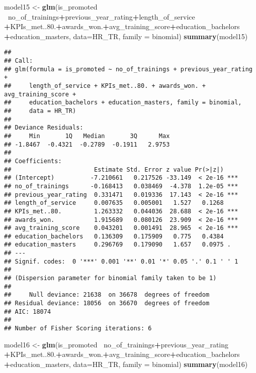 \documentclass[
]{article}
\newenvironment{Shaded}{\begin{snugshade}}{\end{snugshade}}
\newcommand{\DataTypeTok}[1]{\textcolor[rgb]{0.13,0.29,0.53}{#1}}
\newcommand{\FloatTok}[1]{\textcolor[rgb]{0.00,0.00,0.81}{#1}}
\newcommand{\KeywordTok}[1]{\textcolor[rgb]{0.13,0.29,0.53}{\textbf{#1}}}
\newcommand{\NormalTok}[1]{#1}
\newcommand{\OperatorTok}[1]{\textcolor[rgb]{0.81,0.36,0.00}{\textbf{#1}}}
\newcommand{\StringTok}[1]{\textcolor[rgb]{0.31,0.60,0.02}{#1}}
\begin{document}
\begin{Shaded}
\begin{Highlighting}[]
\NormalTok{model15 <-}\StringTok{ }\KeywordTok{glm}\NormalTok{(is_promoted }\OperatorTok{~}\NormalTok{no_of_trainings}\OperatorTok{+}\NormalTok{previous_year_rating}\OperatorTok{+}\NormalTok{length_of_service}
               \OperatorTok{+}\NormalTok{KPIs_met..}\FloatTok{80.}\OperatorTok{+}\NormalTok{awards_won.}\OperatorTok{+}\NormalTok{avg_training_score}\OperatorTok{+}\NormalTok{education_bachelors}
               \OperatorTok{+}\NormalTok{education_masters, }
               \DataTypeTok{data=}\NormalTok{HR_TR, }\DataTypeTok{family =}\NormalTok{ binomial)}
\KeywordTok{summary}\NormalTok{(model15)}
\end{Highlighting}
\end{Shaded}

\begin{verbatim}
## 
## Call:
## glm(formula = is_promoted ~ no_of_trainings + previous_year_rating + 
##     length_of_service + KPIs_met..80. + awards_won. + avg_training_score + 
##     education_bachelors + education_masters, family = binomial, 
##     data = HR_TR)
## 
## Deviance Residuals: 
##     Min       1Q   Median       3Q      Max  
## -1.8467  -0.4321  -0.2789  -0.1911   2.9753  
## 
## Coefficients:
##                       Estimate Std. Error z value Pr(>|z|)    
## (Intercept)          -7.210661   0.217526 -33.149  < 2e-16 ***
## no_of_trainings      -0.168413   0.038469  -4.378  1.2e-05 ***
## previous_year_rating  0.331471   0.019336  17.143  < 2e-16 ***
## length_of_service     0.007635   0.005001   1.527   0.1268    
## KPIs_met..80.         1.263332   0.044036  28.688  < 2e-16 ***
## awards_won.           1.915689   0.080126  23.909  < 2e-16 ***
## avg_training_score    0.043201   0.001491  28.965  < 2e-16 ***
## education_bachelors   0.136309   0.175909   0.775   0.4384    
## education_masters     0.296769   0.179090   1.657   0.0975 .  
## ---
## Signif. codes:  0 '***' 0.001 '**' 0.01 '*' 0.05 '.' 0.1 ' ' 1
## 
## (Dispersion parameter for binomial family taken to be 1)
## 
##     Null deviance: 21638  on 36678  degrees of freedom
## Residual deviance: 18056  on 36670  degrees of freedom
## AIC: 18074
## 
## Number of Fisher Scoring iterations: 6
\end{verbatim}

\begin{Shaded}
\begin{Highlighting}[]
\NormalTok{model16 <-}\StringTok{ }\KeywordTok{glm}\NormalTok{(is_promoted }\OperatorTok{~}\NormalTok{no_of_trainings}\OperatorTok{+}\NormalTok{previous_year_rating}
               \OperatorTok{+}\NormalTok{KPIs_met..}\FloatTok{80.}\OperatorTok{+}\NormalTok{awards_won.}\OperatorTok{+}\NormalTok{avg_training_score}\OperatorTok{+}\NormalTok{education_bachelors}
               \OperatorTok{+}\NormalTok{education_masters, }
               \DataTypeTok{data=}\NormalTok{HR_TR, }\DataTypeTok{family =}\NormalTok{ binomial)}
\KeywordTok{summary}\NormalTok{(model16)}
\end{Highlighting}
\end{Shaded}
\end{document}
